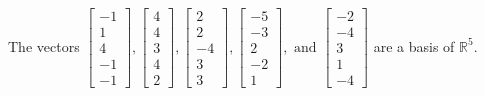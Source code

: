 \begin{exercise}
\begin{exerciseStatement}
  \end{exerciseStatement}
  \begin{exerciseAnswer}
   The vectors \(\left[\begin{array}{r}
-1 \\
1 \\
4 \\
-1 \\
-1
\end{array}\right] , \left[\begin{array}{r}
4 \\
4 \\
3 \\
4 \\
2
\end{array}\right] , \left[\begin{array}{r}
2 \\
2 \\
-4 \\
3 \\
3
\end{array}\right] , \left[\begin{array}{r}
-5 \\
-3 \\
2 \\
-2 \\
1
\end{array}\right] , \text{ and } \left[\begin{array}{r}
-2 \\
-4 \\
3 \\
1 \\
-4
\end{array}\right]\) 
  	 are  a basis of \(\mathbb{R}^5\).
  


  \end{exerciseAnswer}
\end{exercise}
